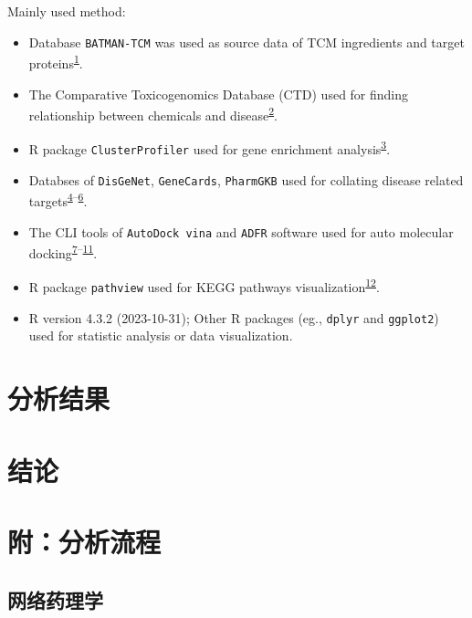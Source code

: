 \documentclass[
]{article}
\providecommand{\tightlist}{%
  \setlength{\itemsep}{0pt}\setlength{\parskip}{0pt}}
\begin{document}
Mainly used method:

\begin{itemize}
\tightlist
\item
  Database \texttt{BATMAN-TCM} was used as source data of TCM ingredients and target proteins\textsuperscript{\protect\hyperlink{ref-BatmanTcm20Kong2024}{1}}.
\item
  The Comparative Toxicogenomics Database (CTD) used for finding relationship between chemicals and disease\textsuperscript{\protect\hyperlink{ref-ComparativeToxDavis2023}{2}}.
\item
  R package \texttt{ClusterProfiler} used for gene enrichment analysis\textsuperscript{\protect\hyperlink{ref-ClusterprofilerWuTi2021}{3}}.
\item
  Databses of \texttt{DisGeNet}, \texttt{GeneCards}, \texttt{PharmGKB} used for collating disease related targets\textsuperscript{\protect\hyperlink{ref-TheDisgenetKnPinero2019}{4}--\protect\hyperlink{ref-PharmgkbAWorBarbar2018}{6}}.
\item
  The CLI tools of \texttt{AutoDock\ vina} and \texttt{ADFR} software used for auto molecular docking\textsuperscript{\protect\hyperlink{ref-AutodockVina1Eberha2021}{7}--\protect\hyperlink{ref-AutodockfrAdvRavind2015}{11}}.
\item
  R package \texttt{pathview} used for KEGG pathways visualization\textsuperscript{\protect\hyperlink{ref-PathviewAnRLuoW2013}{12}}.
\item
  R version 4.3.2 (2023-10-31); Other R packages (eg., \texttt{dplyr} and \texttt{ggplot2}) used for statistic analysis or data visualization.
\end{itemize}

\hypertarget{results}{%
\section{分析结果}\label{results}}

\hypertarget{dis}{%
\section{结论}\label{dis}}

\hypertarget{workflow}{%
\section{附：分析流程}\label{workflow}}

\hypertarget{ux7f51ux7edcux836fux7406ux5b66}{%
\subsection{网络药理学}\label{ux7f51ux7edcux836fux7406ux5b66}}
\end{document}
